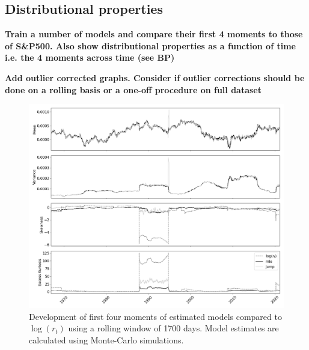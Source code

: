 \subsection{Distributional properties}
\label{Sec: Distributional properties}

\textbf{Train a number of models and compare their first 4 moments to those of S\&P500. Also show distributional properties as a function of time i.e. the 4 moments across time (see BP)}

\textbf{Add outlier corrected graphs. Consider if outlier corrections should be done on a rolling basis or a one-off procedure on full dataset}

\begin{figure}[H] 
    \centering
    \includegraphics[width=1.0\textwidth]{analysis/stylized_facts/images/rolling_moments.png}
    \caption{Development of first four moments of estimated models compared to $\log(r_t)$ using a rolling window of 1700 days. Model estimates are calculated using Monte-Carlo simulations.}
    \label{fig:stylized_facts_rolling_moments} 
\end{figure}


